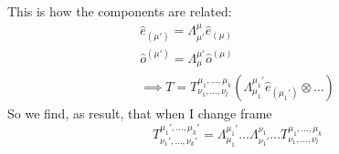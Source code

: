 This is how the components are related:
\begin{gather*}
\hat{e}_{\left( \mu ' \right)} = \Lambda^{\mu }_{\mu '} \hat{e}_{\left( \mu  \right)} \\
\hat{o}^{\left( \mu ' \right)} = \Lambda^{\mu '}_{\mu }\hat{o}^{\left( \mu  \right)} \\
\implies T = T^{\mu_{1}, \ldots , \mu_{k}}_{\nu_{1}, \ldots , \nu_{l}} \left( \Lambda^{\mu_{1}'}_{\mu_{1}} \hat{e}_{\left( \mu_{1}' \right)} \otimes \ldots  \right)
\end{gather*}
So we find, as result, that when I change frame
\begin{equation}
T^{\mu_{1}', \ldots , \mu_{k}'}_{\nu_{1}', \ldots , \nu_{k}'} = \Lambda^{\mu_{1}'}_{\mu_{1}} \ldots \Lambda^{\nu_{1}}_{\nu_{1}'} \ldots T^{\mu_{1}, ..., \mu_{k}}_{\nu_{1}, \ldots , \nu_{l}}
\end{equation}

